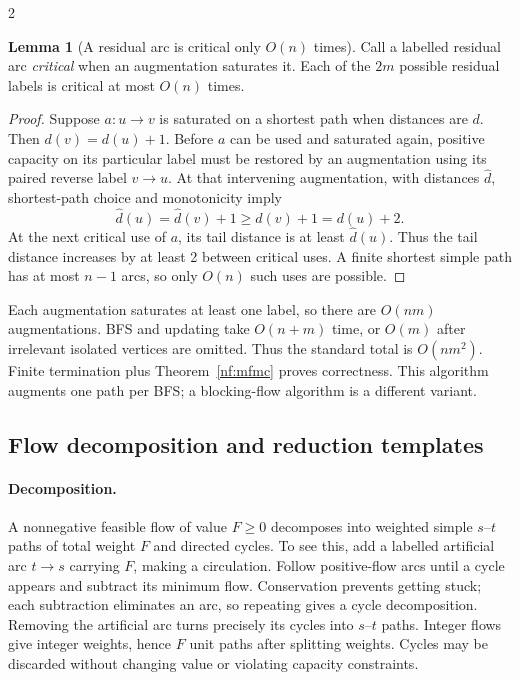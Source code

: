 \documentclass[8pt]{extarticle}
\theoremstyle{definition}
\newtheorem{lemma}[definition]{Lemma}
\begin{document}
\begin{multicols*}{2}
\begin{lemma}[A residual arc is critical only $O(n)$ times]\label{nf:critical}
Call a labelled residual arc \emph{critical} when an augmentation saturates
it. Each of the $2m$ possible residual labels is critical at most $O(n)$ times.
\end{lemma}
\begin{proof}
Suppose $a:u\to v$ is saturated on a shortest path when distances are $d$.
Then $d(v)=d(u)+1$. Before $a$ can be used and saturated again, positive
capacity on its particular label must be restored by an augmentation using
its paired reverse label $v\to u$. At that intervening augmentation, with
distances $\widehat d$, shortest-path choice and monotonicity imply
\[
 \widehat d(u)=\widehat d(v)+1\ge d(v)+1=d(u)+2.
\]
At the next critical use of $a$, its tail distance is at least
$\widehat d(u)$. Thus the tail distance increases by at least 2 between
critical uses. A finite shortest simple path has at most $n-1$ arcs, so only
$O(n)$ such uses are possible.
\end{proof}
Each augmentation saturates at least one label, so there are $O(nm)$
augmentations. BFS and updating take $O(n+m)$ time, or $O(m)$ after irrelevant
isolated vertices are omitted. Thus the standard total is $O(nm^2)$.
Finite termination plus Theorem~\ref{nf:mfmc} proves correctness.
This algorithm augments one path per BFS; a blocking-flow algorithm is a
different variant.

\subsection{Flow decomposition and reduction templates}\label{nf:reductions}
\paragraph{Decomposition.}
A nonnegative feasible flow of value $F\ge0$ decomposes into weighted simple
$s$--$t$ paths of total weight $F$ and directed cycles. To see this, add a
labelled artificial arc $t\to s$ carrying $F$, making a circulation.
Follow positive-flow arcs until a cycle appears and subtract its minimum
flow. Conservation prevents getting stuck; each subtraction eliminates an
arc, so repeating gives a cycle decomposition. Removing the artificial arc
turns precisely its cycles into $s$--$t$ paths. Integer flows give integer
weights, hence $F$ unit paths after splitting weights. Cycles may be discarded
without changing value or violating capacity constraints.


\end{multicols*}
\end{document}
